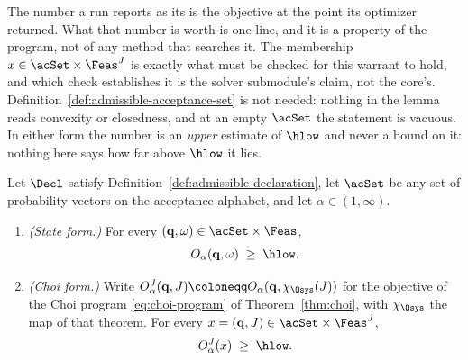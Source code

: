 
The number a run reports as its  is the objective at the
point its optimizer returned. What that number is worth is one line, and it
is a property of the program, not of any method that searches it. The
membership $x\in\acSet\times\Feas^{J}$ is exactly what must be checked for
this warrant to hold, and which check establishes it is the solver
submodule's claim, not the core's. Definition~\ref{def:admissible-acceptance-set} is not needed:
nothing in the lemma reads convexity or closedness, and at an empty
$\acSet$ the statement is vacuous. In either form the number is an \emph{upper}
estimate of $\hlow$ and never a bound on it: nothing here says how far above
$\hlow$ it lies.

\begin{lemma}\label{lem:estimate}
Let $\Decl$ satisfy Definition~\ref{def:admissible-declaration}, let $\acSet$ be any set
of probability vectors on the acceptance alphabet, and let
$\alpha\in(1,\infty)$.
\begin{enumerate}[label=(\roman*),leftmargin=2.2em]
\item \emph{(State form.)} For every $(\mathbf q,\omega)\in\acSet\times\Feas$,
\begin{equation}\label{eq:estimate}
  O_{\alpha}(\mathbf q,\omega)\;\ge\;\hlow .
\end{equation}
\item \emph{(Choi form.)} Write
$O^{J}_{\alpha}(\mathbf q,J)\coloneqq O_{\alpha}(\mathbf q,\chi_{\Qsys}(J))$
for the objective of the Choi program \eqref{eq:choi-program} of
Theorem~\ref{thm:choi}, with $\chi_{\Qsys}$ the map of that theorem. For
every $x=(\mathbf q,J)\in\acSet\times\Feas^{J}$,
\begin{equation}\label{eq:estimate-choi}
  O^{J}_{\alpha}(x)\;\ge\;\hlow .
\end{equation}
\end{enumerate}
\end{lemma}

